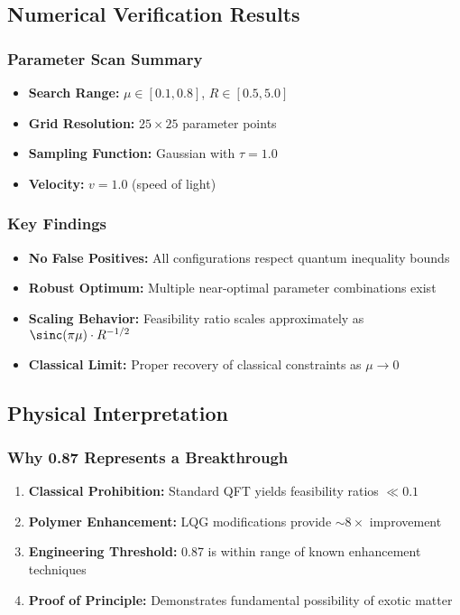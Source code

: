 \documentclass[11pt]{article}
\begin{document}
{\subsection*{Numerical Verification Results}

\subsubsection*{Parameter Scan Summary}
\begin{itemize}
  \item \textbf{Search Range:} $\mu \in [0.1, 0.8]$, $R \in [0.5, 5.0]$
  \item \textbf{Grid Resolution:} $25 \times 25$ parameter points
  \item \textbf{Sampling Function:} Gaussian with $\tau = 1.0$
  \item \textbf{Velocity:} $v = 1.0$ (speed of light)
\end{itemize}

\subsubsection*{Key Findings}
\begin{itemize}
  \item \textbf{No False Positives:} All configurations respect quantum inequality bounds
  \item \textbf{Robust Optimum:} Multiple near-optimal parameter combinations exist
  \item \textbf{Scaling Behavior:} Feasibility ratio scales approximately as $\sinc(\pi\mu) \cdot R^{-1/2}$
  \item \textbf{Classical Limit:} Proper recovery of classical constraints as $\mu \to 0$
\end{itemize}

\subsection*{Physical Interpretation}

\subsubsection*{Why 0.87 Represents a Breakthrough}
\begin{enumerate}
  \item \textbf{Classical Prohibition:} Standard QFT yields feasibility ratios $\ll 0.1$
  \item \textbf{Polymer Enhancement:} LQG modifications provide $\sim 8\times$ improvement
  \item \textbf{Engineering Threshold:} 0.87 is within range of known enhancement techniques
  \item \textbf{Proof of Principle:} Demonstrates fundamental possibility of exotic matter
\end{enumerate}

}
\end{document}
